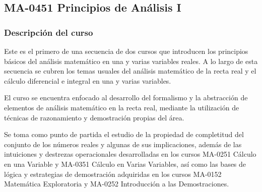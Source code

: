 \newpage
\subsection*{MA-0451 Principios de Análisis I}

\hypertarget{MA0451}{}
\begin{refsection}
\begin{table}[H]
\end{table}



\subsubsection*{Descripción del curso}

Este es el primero de una secuencia de dos cursos que introducen los principios básicos del análisis matemático en una y varias variables reales. A lo largo de esta secuencia se cubren los temas usuales del análisis matemático
de la recta real y el cálculo diferencial e integral en una y varias variables. 

El curso se encuentra enfocado al desarrollo del formalismo y la abstracción de elementos de análisis matemático en la recta real, mediante la utilización de técnicas de razonamiento y demostración propias del área.

Se toma como punto de partida el estudio de la propiedad de completitud del conjunto de los números reales y algunas de sus implicaciones, además de las intuiciones y destrezas operacionales desarrolladas en los cursos MA-0251 Cálculo en una Variable y MA-0351 Cálculo en Varias Variables, así como las bases de lógica y estrategias de demostración adquiridas en los cursos MA-0152 Matemática Exploratoria y MA-0252 Introducción a las Demostraciones.






\end{refsection}
